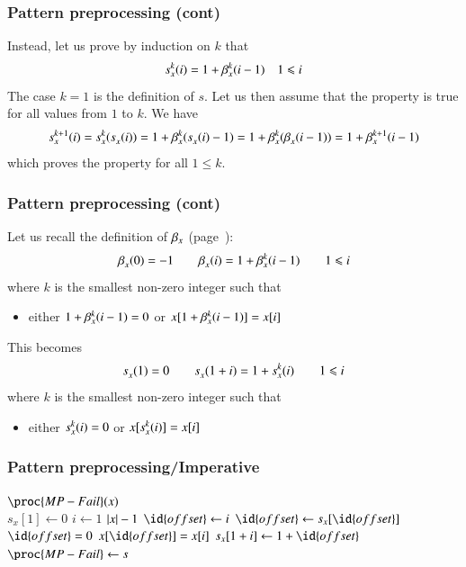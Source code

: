 %
\begin{frame}
\frametitle{Pattern preprocessing (cont)}

Instead, let us prove by induction on \(k\) that
\[
s_{x}^{k}(i) = 1 + \beta_{x}^{k}(i-1) \quad 1 \leqslant i
\]
The case \(k=1\) is the definition of \(s\). Let us then assume that
the property is true for all values from \(1\) to \(k\). We have
\[
  s_{x}^{k+1}(i)
= s_{x}^{k}(s_{x}^{}(i))
= 1 + \beta_{x}^{k}(s_{x}^{}(i)-1)
= 1 + \beta_{x}^{k}(\beta_{x}^{}(i-1))
= 1 + \beta_{x}^{k+1}(i-1)
\]
which proves the property for all \(1 \leqslant k\).

\end{frame}

%
\begin{frame}
\frametitle{Pattern preprocessing (cont)}

Let us recall the definition of \(\beta_{x}\) (page~\pageref{beta_def}):
\[
\beta_{x}^{}(0) = -1 \qquad \beta_{x}^{}(i) = 1 + \beta_{x}^{k}(i-1)
\qquad 1 \leqslant i
\]
where \(k\) is the smallest non-zero integer such that
\begin{itemize}

  \item either \(1 + \beta_{x}^{k}(i-1) = 0\) or
    \(x[1+\beta_{x}^{k}(i-1)] = x[i]\)

\end{itemize}
This becomes
\[
s_{x}^{}(1) = 0 \qquad s_{x}^{}(1 + i) = 1 + s_{x}^{k}(i)
\qquad 1 \leqslant i
\]
where \(k\) is the smallest non-zero integer such that
\begin{itemize}

  \item either \(s_{x}^{k}(i) = 0\) or \(x[s_{x}^{k}(i)] = x[i]\)

\end{itemize}

\end{frame}

%
\begin{frame}
\frametitle{Pattern preprocessing/Imperative}

\begin{codebox}
\(\proc{MP-Fail}(x)\)\\
\li \(s_{x}[1] \gets 0\)
\li \For \(i \gets 1\) \To \(\lvert{x}\lvert{}-1\)
\li	\Do \(\id{offset} \gets i\)
\li     \Repeat
\li     \(\id{offset} \gets s_{x}[\id{offset}]\)
\li     \Until \(\id{offset} = 0\) \LogOr \(x[\id{offset}] = x[i]\)
\li	    \(s_{x}[1 + i] \gets 1 + \id{offset}\)
    \End
\li \(\proc{MP-Fail} \gets s\)
\end{codebox}

\end{frame}

